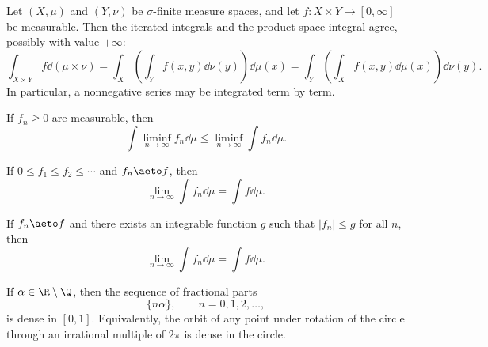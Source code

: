     \begin{theorem}
        Let $(X,\mu)$ and $(Y,\nu)$ be $\sigma$-finite measure spaces, and let
        $f\colon X\times Y\to[0,\infty]$ be measurable. Then the iterated integrals
        and the product-space integral agree, possibly with value $+\infty$:
        \[
            \int_{X\times Y}f\dd(\mu\times\nu)
            =
            \int_X\left(\int_Y f(x,y)\dd\nu(y)\right)\dd\mu(x)
            =
            \int_Y\left(\int_X f(x,y)\dd\mu(x)\right)\dd\nu(y).
        \]
        In particular, a nonnegative series may be integrated term by term.
    \end{theorem}

    \begin{theorem}
        If $f_n\geq 0$ are measurable, then
        \[
            \int \liminf_{n\to\infty}f_n\dd\mu
            \leq
            \liminf_{n\to\infty}\int f_n\dd\mu.
        \]
    \end{theorem}

    \begin{theorem}
        If $0\leq f_1\leq f_2\leq\cdots$ and $f_n\aeto f$,
        then
        \[
            \lim\limits_{n\to\infty}\int f_n\dd\mu
            =
            \int f\dd\mu.
        \]
    \end{theorem}

    \begin{theorem}
        If $f_n\aeto f$ and there exists an integrable function
        $g$ such that $|f_n|\leq g$ for all $n$, then
        \[
            \lim\limits_{n\to\infty}\int f_n\dd\mu
            =
            \int f\dd\mu.
        \]
    \end{theorem}

    \begin{theorem}\label{pp:density}
        If $\alpha\in\R\setminus\Q$, then the sequence of fractional parts
        \[
            \{n\alpha\},\qquad n=0,1,2,\dots,
        \]
        is dense in $[0,1]$. Equivalently, the orbit of any point under rotation
        of the circle through an irrational multiple of $2\pi$ is dense in the
        circle.
    \end{theorem}

